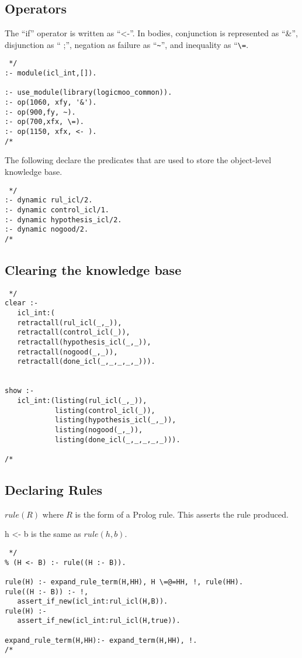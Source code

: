 \documentclass[11pt,fleqn]{article}
\begin{document}
\subsection{Operators}
The ``if'' operator is written as ``{\ttfamily <-}''.  In bodies,
conjunction is represented as ``{\ttfamily \&}'', disjunction as ``{\ttfamily
;}'', negation as failure as ``\verb|~|'', and inequality as
``\verb|\=|.
\begin{verbatim} */
:- module(icl_int,[]).

:- use_module(library(logicmoo_common)).
:- op(1060, xfy, '&').
:- op(900,fy, ~).
:- op(700,xfx, \=).
:- op(1150, xfx, <- ).
/* \end{verbatim}
The following declare the predicates that are used to store the
object-level knowledge base.
\begin{verbatim} */
:- dynamic rul_icl/2.
:- dynamic control_icl/1.
:- dynamic hypothesis_icl/2.
:- dynamic nogood/2.
/* \end{verbatim}
   
\subsection{Clearing the knowledge base}
\begin{verbatim} */
clear :-
   icl_int:(
   retractall(rul_icl(_,_)),
   retractall(control_icl(_)),
   retractall(hypothesis_icl(_,_)),
   retractall(nogood(_,_)),
   retractall(done_icl(_,_,_,_,_))).


show :-
   icl_int:(listing(rul_icl(_,_)),
            listing(control_icl(_)),
            listing(hypothesis_icl(_,_)),
            listing(nogood(_,_)),
            listing(done_icl(_,_,_,_,_))).

/* \end{verbatim}

\subsection{Declaring Rules}

$rule(R)$ where $R$ is the form of a Prolog rule. This asserts the
rule produced. 

{\ttfamily h <- b} is the same as $rule(h,b)$.

\begin{verbatim} */
% (H <- B) :- rule((H :- B)).

rule(H) :- expand_rule_term(H,HH), H \=@=HH, !, rule(HH).
rule((H :- B)) :- !,
   assert_if_new(icl_int:rul_icl(H,B)).
rule(H) :-
   assert_if_new(icl_int:rul_icl(H,true)).

expand_rule_term(H,HH):- expand_term(H,HH), !.
/* \end{verbatim}
\end{document}
